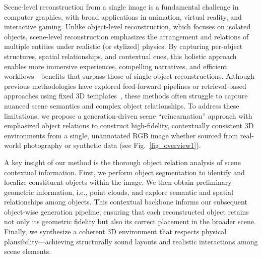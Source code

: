 

Scene-level reconstruction from a single image is a fundamental challenge in computer graphics, with broad applications in animation, virtual reality, and interactive gaming. Unlike object-level reconstruction, which focuses on isolated objects, scene-level reconstruction emphasizes the arrangement and relations of multiple entities under realistic (or stylized) physics. By capturing per-object structures, spatial relationships, and contextual cues, this holistic approach enables more immersive experiences, compelling narratives, and efficient workflows—benefits that surpass those of single-object reconstructions. Although previous methodologies have explored feed-forward pipelines or retrieval-based approaches using fixed 3D templates~\cite{liu2022towards,dai2024automated}, these methods often struggle to capture nuanced scene semantics and complex object relationships. To address these limitations, we propose a generation-driven scene ``reincarnation'' approach with emphasized object relations to construct high-fidelity, contextually consistent 3D environments from a single, unannotated RGB image whether sourced from real-world photography or synthetic data (see Fig.~\ref{fig_overview1}).

A key insight of our method is the thorough object relation analysis of scene contextual information. First, we perform object segmentation to identify and localize constituent objects within the image. We then obtain preliminary geometric information, i.e., point clouds, and explore semantic and spatial relationships among objects. This contextual backbone informs our subsequent object-wise generation pipeline, ensuring that each reconstructed object retains not only its geometric fidelity but also its correct placement in the broader scene. Finally, we synthesize a coherent 3D environment that respects physical plausibility—achieving structurally sound layouts and realistic interactions among scene elements.



